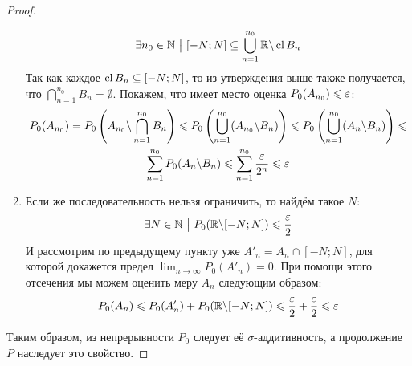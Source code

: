 \begin{proof}
\begin{enumerate}
		\[
			\exists n_0 \in \mathbb{N} \ \big|\  [-N; N] \subseteq \bigcup_{n = 1}^{n_0} \mathbb{R} \backslash \operatorname{cl} B_n 
		\]
		Так как каждое $\operatorname{cl} B_n \subseteq [-N; N]$, то из утверждения выше также получается, что $\bigcap_{n = 1}^{n_0} B_n = \emptyset$. Покажем, что имеет место оценка $P_0(A_{n_0}) \leqslant \varepsilon$:
		\begin{multline*}
			P_0(A_{n_0}) = P_0\left(A_{n_0} \backslash \bigcap_{n = 1}^{n_0} B_n\right) \leqslant P_0\left(\bigcup_{n = 1}^{n_0} (A_{n_0} \backslash B_n)\right) \leqslant P_0\left(\bigcup_{n = 1}^{n_0} (A_n \backslash B_n)\right) \leqslant
			\\
			\sum_{n = 1}^{n_0} P_0(A_n \backslash B_n) \leqslant \sum_{n = 1}^{n_0} \frac{\varepsilon}{2^n} \leqslant \varepsilon
		\end{multline*}
		
		\item Если же последовательность нельзя ограничить, то найдём такое $N$:
		\[
			\exists N \in \mathbb{N} \ \big|\  P_0(\mathbb{R} \backslash [-N; N]) \leqslant \frac{\varepsilon}{2}
		\]
		И рассмотрим по предыдущему пункту уже $A'_n = A_n \cap [-N; N]$, для которой докажется предел $\lim_{n \to \infty} P_0(A'_n) = 0$. При помощи этого отсечения мы можем оценить меру $A_n$ следующим образом:
		\[
			P_0(A_n) \leqslant P_0(A'_n) + P_0(\mathbb{R} \backslash [-N; N]) \leqslant \frac{\varepsilon}{2} + \frac{\varepsilon}{2} \leqslant \varepsilon
		\]
	\end{enumerate}
	Таким образом, из непрерывности $P_0$ следует её $\sigma$-аддитивность, а продолжение $P$ наследует это свойство.
\end{proof}